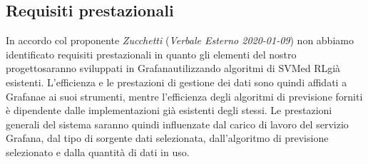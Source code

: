 \subsection{Requisiti prestazionali}
	In accordo col proponente \textit{Zucchetti} (\textit{Verbale Esterno 2020-01-09}) non abbiamo identificato requisiti prestazionali in quanto gli elementi del nostro progetto\glosp saranno sviluppati in Grafana\glosp utilizzando algoritmi di SVM\glosp ed RL\glosp già esistenti. L'efficienza e le prestazioni di gestione dei dati sono quindi affidati a Grafana\glosp e ai suoi strumenti, mentre l'efficienza degli algoritmi di previsione forniti è dipendente dalle implementazioni già esistenti degli stessi. Le prestazioni generali del sistema saranno quindi influenzate dal carico di lavoro del servizio Grafana\glo, dal tipo di sorgente dati selezionata, dall'algoritmo di previsione selezionato e dalla quantità di dati in uso.
